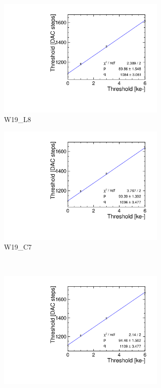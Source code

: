 \begin{figure}[htbp]
\begin{subfigure}[b]{0.45\textwidth}
    \includegraphics[width=0.9\textwidth]{./figures/Calibration/THLcalibration_W0019_L08.pdf}
    \caption{W19\_L8}
  \end{subfigure} \hfill
  \begin{subfigure}[b]{0.45\textwidth}
    \includegraphics[width=0.9\textwidth]{./figures/Calibration/THLcalibration_W0019_C07.pdf}
    \caption{W19\_C7}
  \end{subfigure}\\
  \begin{subfigure}[b]{0.45\textwidth}
    \includegraphics[width=0.9\textwidth]{./figures/Calibration/THLcalibration_W0005_E02.pdf}

\end{subfigure}
\end{figure}
